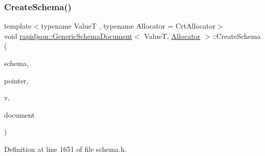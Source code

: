 \subsubsection{\texorpdfstring{CreateSchema()}{CreateSchema()}}
{\footnotesize\ttfamily template$<$typename ValueT , typename Allocator  = Crt\+Allocator$>$ \\
void \mbox{\hyperlink{classrapidjson_1_1_generic_schema_document}{rapidjson\+::\+Generic\+Schema\+Document}}$<$ ValueT, \mbox{\hyperlink{classrapidjson_1_1_allocator}{Allocator}} $>$\+::Create\+Schema (\begin{DoxyParamCaption}\item[{const \mbox{\hyperlink{classrapidjson_1_1_generic_schema_document_aaf4e7f371de938025f7ed4be3b83266e}{Schema\+Type}} $\ast$$\ast$}]{schema,  }\item[{const \mbox{\hyperlink{classrapidjson_1_1_generic_schema_document_a61540c0f8aa542760ae03257a0e6dab7}{Pointer\+Type}} \&}]{pointer,  }\item[{const \mbox{\hyperlink{classrapidjson_1_1_generic_schema_document_a87eb1db271e7f57442802a5f4f6178f3}{Value\+Type}} \&}]{v,  }\item[{const \mbox{\hyperlink{classrapidjson_1_1_generic_schema_document_a87eb1db271e7f57442802a5f4f6178f3}{Value\+Type}} \&}]{document }\end{DoxyParamCaption})\hspace{0.3cm}{\ttfamily [private]}}



Definition at line 1651 of file schema.\+h.


